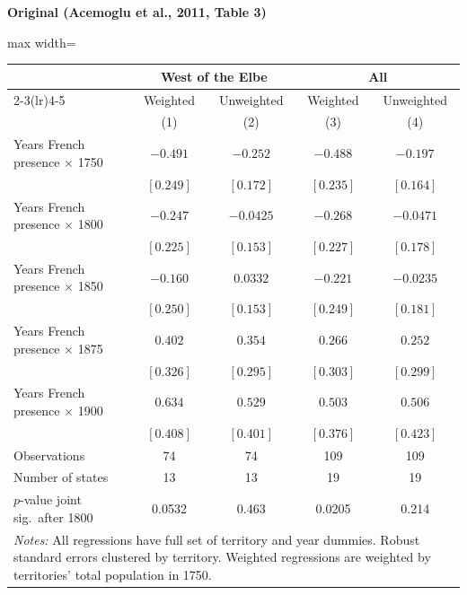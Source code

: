 \documentclass[11pt,a4paper]{article}
\begin{document}
\vspace{0.3cm}
\noindent{}

\vspace{0.5cm}
\begin{minipage}[t]{0.48\textwidth}
\centering
\textbf{\large Original (Acemoglu et al., 2011, Table 3)}
\vspace{0.3cm}

\begin{adjustbox}{max width=\textwidth}
\begin{tabular}{lcccc}
\toprule
 & \multicolumn{2}{c}{West of the Elbe} & \multicolumn{2}{c}{All} \\
\cmidrule(lr){2-3}\cmidrule(lr){4-5}
 & Weighted & Unweighted & Weighted & Unweighted \\
 & (1) & (2) & (3) & (4) \\
\midrule
Years French presence $\times$ 1750 & $-0.491$ & $-0.252$ & $-0.488$ & $-0.197$ \\
 & $[0.249]$ & $[0.172]$ & $[0.235]$ & $[0.164]$ \\[0.3em]
Years French presence $\times$ 1800 & $-0.247$ & $-0.0425$ & $-0.268$ & $-0.0471$ \\
 & $[0.225]$ & $[0.153]$ & $[0.227]$ & $[0.178]$ \\[0.3em]
Years French presence $\times$ 1850 & $-0.160$ & $0.0332$ & $-0.221$ & $-0.0235$ \\
 & $[0.250]$ & $[0.153]$ & $[0.249]$ & $[0.181]$ \\[0.3em]
Years French presence $\times$ 1875 & $0.402$ & $0.354$ & $0.266$ & $0.252$ \\
 & $[0.326]$ & $[0.295]$ & $[0.303]$ & $[0.299]$ \\[0.3em]
Years French presence $\times$ 1900 & $0.634$ & $0.529$ & $0.503$ & $0.506$ \\
 & $[0.408]$ & $[0.401]$ & $[0.376]$ & $[0.423]$ \\[0.3em]
\midrule
Observations & 74 & 74 & 109 & 109 \\
Number of states & 13 & 13 & 19 & 19 \\
$p$-value joint sig.\ after 1800 & 0.0532 & 0.463 & 0.0205 & 0.214 \\
\bottomrule
\multicolumn{5}{p{0.95\textwidth}}{\footnotesize\textit{Notes:} All regressions have full set of territory and year dummies. Robust standard errors clustered by territory. Weighted regressions are weighted by territories' total population in 1750.}
\end{tabular}
\end{adjustbox}
\end{minipage}%
\end{document}
